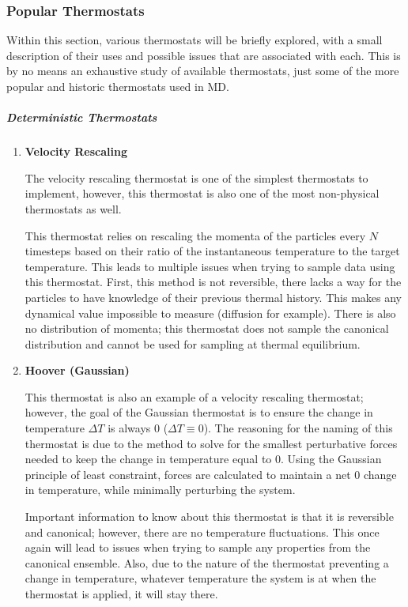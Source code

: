 \documentclass[9pt,bestpractices]{livecoms}
\begin{document}
\subsubsection{Popular Thermostats}
Within this section, various thermostats will be briefly explored, with a small description of their uses and possible issues that are associated with each.
This is by no means an exhaustive study of available thermostats, just some of the more popular and historic thermostats used in MD.

\subparagraph{Deterministic Thermostats}
\begin{enumerate}[listparindent=\parindent]
    \item \textbf{Velocity Rescaling}

        The velocity rescaling thermostat is one of the simplest thermostats to implement, however, this thermostat is also one of the most non-physical thermostats as well.

         This thermostat relies on rescaling the momenta of the particles every $N$ timesteps based on their ratio of the instantaneous temperature to the target temperature\cite{thermostatAlgorithms2005}. 
         This leads to multiple issues when trying to sample data using this thermostat.
         First, this method is not reversible, there lacks a way for the particles to have knowledge of their previous thermal history.
         This makes any dynamical value impossible to measure (diffusion for example). 
         There is also no distribution of momenta; this thermostat does not sample the canonical distribution and cannot be used for sampling at thermal equilibrium.

    \item \textbf{Hoover (Gaussian)}
        
        This thermostat is also an example of a velocity rescaling thermostat; however, the goal of the Gaussian thermostat is to ensure the change in
        temperature $\Delta T$ is always 0 ($\Delta T \equiv 0$).
        The reasoning for the naming of this thermostat is due to the method to solve for the smallest perturbative forces needed to keep the change in temperature equal to 0.
        Using the Gaussian principle of least constraint, forces are calculated to maintain a net 0 change in temperature, while minimally perturbing the system\cite{thermostatAlgorithms2005}.

        Important information to know about this thermostat is that it is reversible and canonical; however, there are no temperature
        fluctuations.
        This once again will lead to issues when trying to sample any properties from the canonical ensemble.
        Also, due to the nature of the thermostat preventing a change in temperature, whatever temperature
        the system is at when the thermostat is applied, it will stay there. 


\end{enumerate}
\end{document}
